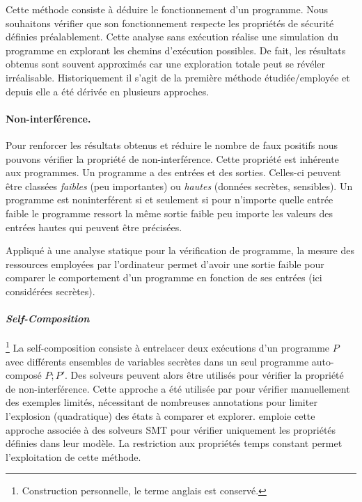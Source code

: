 Cette méthode consiste à déduire le fonctionnement d'un programme. Nous souhaitons vérifier que son fonctionnement respecte les propriétés de sécurité définies préalablement. Cette analyse sans exécution réalise une simulation du programme en explorant les chemins d'exécution possibles. De fait, les résultats obtenus sont souvent approximés car une exploration totale peut se révéler irréalisable. Historiquement il s'agit de la première méthode étudiée/employée et depuis elle a été dérivée en plusieurs approches.\medbreak

\paragraph{Non-interférence.} Pour renforcer les résultats obtenus et réduire le nombre de faux positifs nous pouvons vérifier la propriété de non-interférence. Cette propriété est inhérente aux programmes. Un programme a des entrées et des sorties. Celles-ci peuvent être classées \textit{faibles} (peu importantes) ou \textit{hautes} (données secrètes, sensibles). Un programme est noninterférent si et seulement si pour n'importe quelle entrée faible le programme ressort la même sortie faible peu importe les valeurs des entrées hautes qui peuvent être précisées.

Appliqué à une analyse statique pour la vérification de programme, la mesure des ressources employées par l'ordinateur permet d'avoir une sortie faible pour comparer le comportement d'un programme en fonction de ses entrées (ici considérées secrètes).

\paragraph{\textit{Self-Composition}}\footnote{Construction personnelle, le terme anglais est conservé.} La self-composition consiste à entrelacer deux exécutions d'un programme $P$ avec différents ensembles de variables secrètes dans un seul programme auto-composé $P;P'$. Des solveurs peuvent alors être utilisés pour vérifier la propriété de non-interférence. Cette approche a été utilisée par \citeauthor{ABPV13} \cite{ABPV13} pour vérifier manuellement des exemples limités, nécessitant de nombreuses annotations pour limiter l'explosion (quadratique) des états à comparer et explorer. \cite{binsecRel2019} emploie cette approche associée à des solveurs SMT pour vérifier uniquement les propriétés définies dans leur modèle. La restriction aux propriétés temps constant permet l'exploitation de cette méthode.

